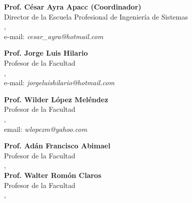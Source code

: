 \begin{center}
\textbf{Prof. César Ayra Apacc (Coordinador)}\\
Director de la Escuela Profesional de Ingeniería de Sistemas\\
\institution, \city\\
e-mail: \textit{cesar\_ayra@hotmail.com}

\textbf{Prof. Jorge Luis Hilario}\\
Profesor de la Facultad\\
\institution, \city\\
e-mail: \textit{jorgeluishilario@hotmail.com}

\textbf{Prof. Wilder López Meléndez}\\
Profesor de la Facultad \\
\institution, \city\\
email: \textit{wlopezm@yahoo.com}

\textbf{Prof. Adán Francisco Abimael}\\
Profesor de la Facultad\\
\institution, \city\\

\textbf{Prof. Walter Romón Claros}\\
Profesor de la Facultad\\
\institution, \city\\
\end{center}